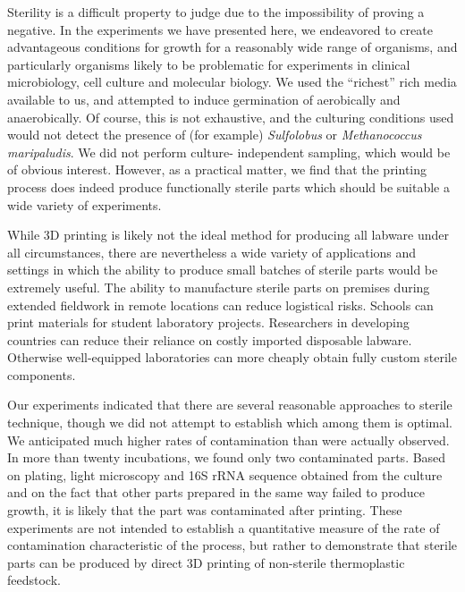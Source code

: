 \documentclass[fleqn,10pt]{wlpeerj}
\begin{document}
Sterility is a difficult property to judge due to the impossibility of proving
a negative. In the experiments we have presented here, we endeavored to create
advantageous conditions for growth for a reasonably wide range of organisms,
and particularly organisms likely to be problematic for experiments in
clinical microbiology, cell culture and molecular biology. We used the
``richest'' rich media available to us, and attempted to induce germination of
aerobically and anaerobically. Of course, this is not exhaustive, and  the
culturing conditions used would not detect the presence of (for example) {\em
Sulfolobus} or {\em Methanococcus maripaludis}. We did not perform culture-
independent sampling, which would be of obvious interest. However, as a
practical matter, we find that the printing process does indeed produce
functionally sterile parts which should be suitable a wide variety of
experiments.

While 3D printing is likely not the ideal method for producing all labware
under all circumstances, there are nevertheless a wide variety of applications
and settings in which the ability to produce small batches of sterile parts
would be extremely useful. The ability to manufacture sterile parts on
premises during extended fieldwork in remote locations can reduce logistical
risks. Schools can print materials for student laboratory projects.
Researchers in developing countries can reduce their reliance on costly
imported disposable labware. Otherwise well-equipped laboratories can more
cheaply obtain fully custom sterile components.

Our experiments indicated that there are several reasonable approaches to
sterile technique, though we did not attempt to establish which among them is
optimal. We anticipated much higher rates of contamination than were actually
observed. In more than twenty incubations, we found only two contaminated
parts. Based on plating, light microscopy and 16S rRNA sequence obtained from
the culture and on the fact that other parts prepared in the same way failed
to produce growth, it is likely that the part was contaminated after printing.
These experiments are not intended to establish a quantitative measure of the
rate of contamination characteristic of the process, but rather to demonstrate
that sterile parts can be produced by direct 3D printing of non-sterile
thermoplastic feedstock.



\end{document}
